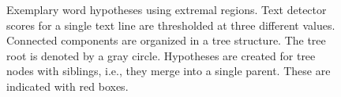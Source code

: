 \begin{figure}
\caption{Exemplary word hypotheses using extremal regions. Text detector
scores for a single text line are thresholded at three different values. Connected components
are organized in a tree structure. The tree root is denoted by a gray circle. Hypotheses
are created for tree nodes with siblings, i.e., they merge into a single parent. These are
indicated with red boxes.}
\label{fig:er_wordhyp}
\end{figure}
